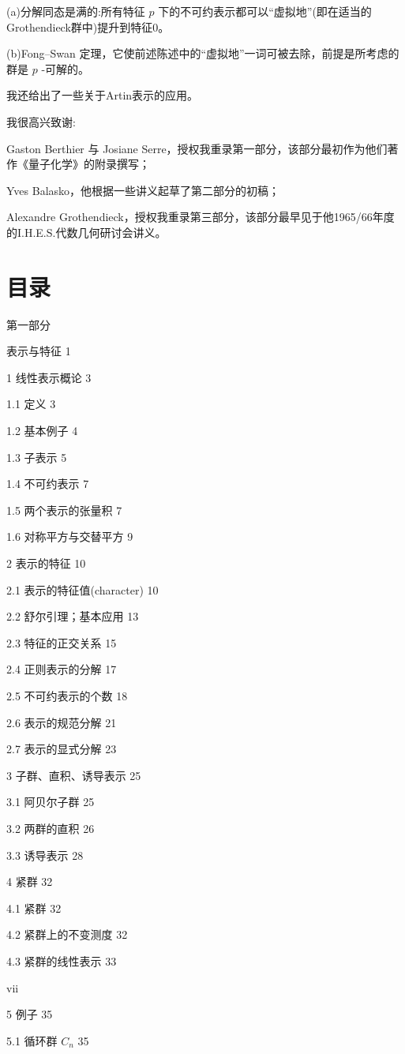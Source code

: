 \documentclass[10pt]{article}
\begin{document}
(a)分解同态是满的:所有特征 \(p\) 下的不可约表示都可以“虚拟地”(即在适当的Grothendieck群中)提升到特征0。

(b)Fong–Swan 定理，它使前述陈述中的“虚拟地”一词可被去除，前提是所考虑的群是 \(p\) -可解的。

我还给出了一些关于Artin表示的应用。

我很高兴致谢:

Gaston Berthier 与 Josiane Serre，授权我重录第一部分，该部分最初作为他们著作《量子化学》的附录撰写；

Yves Balasko，他根据一些讲义起草了第二部分的初稿；

Alexandre Grothendieck，授权我重录第三部分，该部分最早见于他1965/66年度的I.H.E.S.代数几何研讨会讲义。

\section*{目录}

第一部分

表示与特征 1

1 线性表示概论 3

1.1 定义 3

1.2 基本例子 4

1.3 子表示 5

1.4 不可约表示 7

1.5 两个表示的张量积 7

1.6 对称平方与交替平方 9

2 表示的特征 10

2.1 表示的特征值(character) 10

2.2 舒尔引理；基本应用 13

2.3 特征的正交关系 15

2.4 正则表示的分解 17

2.5 不可约表示的个数 18

2.6 表示的规范分解 21

2.7 表示的显式分解 23

3 子群、直积、诱导表示 25

3.1 阿贝尔子群 25

3.2 两群的直积 26

3.3 诱导表示 28

4 紧群 32

4.1 紧群 32

4.2 紧群上的不变测度 32

4.3 紧群的线性表示 33

vii

5 例子 35

5.1 循环群 \({C}_{n}\) 35
\end{document}
